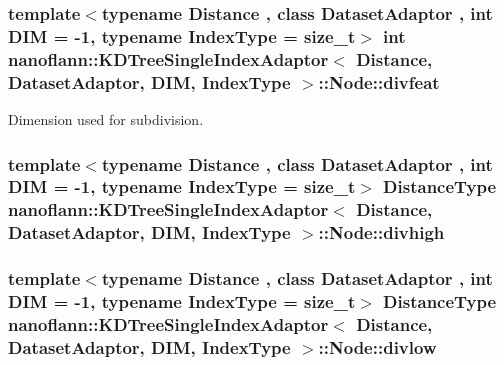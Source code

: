 \hypertarget{structnanoflann_1_1_k_d_tree_single_index_adaptor_1_1_node_ace95e6da06058dfd6e7de0040b4ef678}{
\subsubsection[{divfeat}]{\setlength{\rightskip}{0pt plus 5cm}template$<$typename Distance , class Dataset\-Adaptor , int D\-I\-M = -\/1, typename Index\-Type  = size\-\_\-t$>$ int {\bf nanoflann\-::\-K\-D\-Tree\-Single\-Index\-Adaptor}$<$ Distance, Dataset\-Adaptor, D\-I\-M, Index\-Type $>$\-::Node\-::divfeat}}\label{structnanoflann_1_1_k_d_tree_single_index_adaptor_1_1_node_ace95e6da06058dfd6e7de0040b4ef678}
Dimension used for subdivision. \hypertarget{structnanoflann_1_1_k_d_tree_single_index_adaptor_1_1_node_a3017c990284b230b69304a4a5323e86a}{
\subsubsection[{divhigh}]{\setlength{\rightskip}{0pt plus 5cm}template$<$typename Distance , class Dataset\-Adaptor , int D\-I\-M = -\/1, typename Index\-Type  = size\-\_\-t$>$ {\bf Distance\-Type} {\bf nanoflann\-::\-K\-D\-Tree\-Single\-Index\-Adaptor}$<$ Distance, Dataset\-Adaptor, D\-I\-M, Index\-Type $>$\-::Node\-::divhigh}}\label{structnanoflann_1_1_k_d_tree_single_index_adaptor_1_1_node_a3017c990284b230b69304a4a5323e86a}
\hypertarget{structnanoflann_1_1_k_d_tree_single_index_adaptor_1_1_node_a4a5b1c48526ca182d7d53308579fdc49}{
\subsubsection[{divlow}]{\setlength{\rightskip}{0pt plus 5cm}template$<$typename Distance , class Dataset\-Adaptor , int D\-I\-M = -\/1, typename Index\-Type  = size\-\_\-t$>$ {\bf Distance\-Type} {\bf nanoflann\-::\-K\-D\-Tree\-Single\-Index\-Adaptor}$<$ Distance, Dataset\-Adaptor, D\-I\-M, Index\-Type $>$\-::Node\-::divlow}}\label{structnanoflann_1_1_k_d_tree_single_index_adaptor_1_1_node_a4a5b1c48526ca182d7d53308579fdc49}

